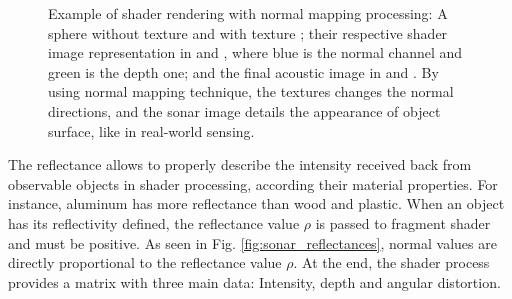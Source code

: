 \documentclass[final,5p,times]{elsarticle}
\begin{document}
\begin{figure}[t]
{        \label{fig:normal_5}
    }
    \captionsetup{justification=centering}
    \caption{Example of shader rendering with normal mapping processing:
    A sphere without texture  and with texture
    ; their respective shader image representation
    in  and , where blue is the
    normal channel and green is the depth one; and the final acoustic
    image in  and . By using
    normal mapping technique, the textures changes the normal directions,
    and the sonar image details the appearance of object surface, like
    in real-world sensing.}
    \label{fig:sonar_normal_mapping}
\end{figure}

The reflectance allows to properly describe the intensity received back
from observable objects in shader processing, according their material
properties. For instance, aluminum has more reflectance than wood and
plastic. When an object has its reflectivity defined, the reflectance
value $\rho$ is passed to fragment shader and must be positive. As seen
in Fig. \ref{fig:sonar_reflectances}, normal values are directly
proportional to the reflectance value $\rho$. At the end, the shader process
provides a matrix with three main data: Intensity, depth and
angular distortion.
\end{document}
